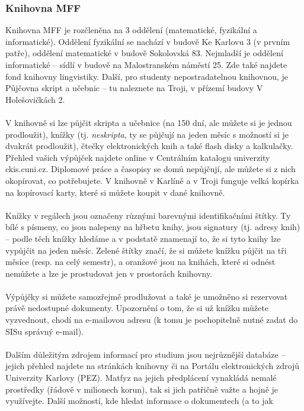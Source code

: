 \subsubsection{Knihovna MFF}
Knihovna MFF je rozčleněna na 3 oddělení (matematické, fyzikální a
informatické). Oddělení fyzikální se nachází v budově Ke Karlovu 3 (v prvním
patře), oddělení matematické v budově Sokolovská 83. Nejmladší je oddělení
informatické – sídlí v budově na Malostranském náměstí 25. Zde také najdete fond
knihovny lingvistiky. Další, pro studenty nepostradatelnou knihovnou, je
Půjčovna skript a učebnic – tu naleznete na Troji, v přízemí budovy V
Holešovičkách 2.
\\\\
V knihovně si lze půjčit skripta a učebnice (na 150 dní, ale můžete si je jednou
prodloužit), knížky (tj. \textit{neskripta}, ty se půjčují na jeden měsíc s
možností si je dvakrát prodloužit), čtečky elektronických knih a také flash
disky a kalkulačky. Přehled vašich výpůjček najdete online v Centrálním katalogu
univerzity ckis.cuni.cz. Diplomové práce a časopisy se domů nepůjčují, ale
můžete si z nich okopírovat, co potřebujete. V knihovně v Karlíně a v Troji
funguje velká kopírka na kopírovací karty, které si můžete koupit v dané
knihovně.
\\\\
Knížky v regálech jsou označeny různými barevnými identifikačními štítky. Ty
bílé s písmeny, co jsou nalepeny na hřbetu knihy, jsou signatury (tj. adresy
knih) – podle těch knížky hledáme a v podstatě znamenají to, že si tyto knihy
lze vypůjčit na jeden měsíc. Zelené štítky značí, že si můžete knížku půjčit na
tři měsíce (resp. na celý semestr), a oranžové jsou na knihách, které si odnést
nemůžete a lze je prostudovat jen v prostorách knihovny.
\\\\
Výpůjčky si můžete samozřejmě prodlužovat a také je umožněno si rezervovat právě
nedostupné dokumenty. Upozornění o tom, že si už knížku můžete vyzvednout, chodí
na e-mailovou adresu (k tomu je pochopitelně nutné zadat do SISu správný
e-mail).
\\\\
Dalším důležitým zdrojem informací pro studium jsou nejrůznější databáze –
jejich přehled najdete na stránkách knihovny či na Portálu elektronických zdrojů
Univerzity Karlovy (PEZ). Matfyz na jejich předplácení vynakládá nemalé
prostředky (řádově v milionech korun), tak si jich patřičně važte a hojně je
využívejte. Další možností, kde hledat informace o dokumentech (a to jak
